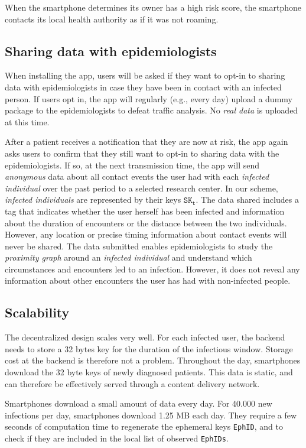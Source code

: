 \documentclass[12pt,a4paper]{article}
\begin{document}
When the smartphone determines its owner has a high risk score, the smartphone contacts
its local health authority as if it was not roaming.
\subsection*{Sharing data with epidemiologists}
When installing the app, users will be asked if they want to opt-in to sharing data with
epidemiologists in case they have been in contact with an infected person. If users opt in, the app will regularly (e.g., every day) upload a dummy package to the epidemiologists to defeat traffic analysis. No \textit{real data}  is uploaded at this time.

After a patient receives a notification that they are now at risk, the app again asks users to confirm that they still want to opt-in to sharing data with the epidemiologists. If so, at the next transmission time, the app will send \textit{anonymous} data about all contact events the user had with each \textit{infected individual} over the past period to a selected research center. In our scheme, \textit{infected individuals} are represented by their keys $\texttt{SK}_\texttt{t}$. The data shared includes a tag that indicates whether the user herself has been infected and information about the duration of encounters or the distance between the two individuals. However, any location or precise timing information about contact events will never be shared. The data submitted enables epidemiologists to study the \textit{proximity graph} around an \textit{infected individual} and understand which circumstances and encounters led to an infection. However, it does not reveal any information about other encounters the user has had with non-infected people.
\subsection*{Scalability}
The decentralized design scales very well. For each infected user, the backend needs to
store a 32 bytes key for the duration of the infectious window. Storage cost at the backend is therefore not a problem. Throughout the day, smartphones download the 32 byte keys of newly diagnosed patients. This data is static, and can therefore be effectively served through a content delivery network.

Smartphones download a small amount of data every day. For 40.000 new infections per
day, smartphones download 1.25 MB each day. They require a few seconds of computation
time to regenerate the ephemeral keys \texttt{EphID}, and to check if they are included in the local list of observed \texttt{EphIDs}.
\clearpage
\end{document}
